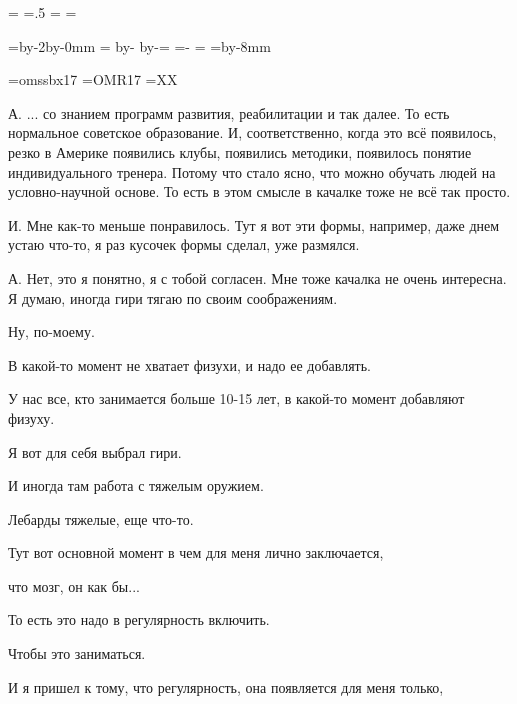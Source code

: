 \pdfpagewidth=297mm
\pdfpageheight=210mm
\pdfhorigin=1in
\pdfvorigin=0pt

\shhtotal=\pdfpagewidth
\htotal=.5\shhtotal
\vtotal=\pdfpageheight
\shoutline=0pt
\shstaplewidth=0pt
\shcrop=0pt
\shfootline={}
\shthickness=0pt
\qonepage

\horigin=4.5mm %
\hsize=\htotal \advance\hsize by-2\horigin \advance\hsize by-0mm %
=\htotal \advance{} by-\hsize \advance{} by-\horigin \horigin=
\hoffset=\htotal \advance\hoffset-\hsize \advance{}\horigin
\output={\ifodd\pageno\hoffset=0pt\fi \plainoutput}
\vorigin=2.5mm
\vsize=\vtotal \advance\vsize by-8mm

\font\speakerF=omssbx17
\font\headlineF=OMR17
\headline={\SEVENTEENRM X\hrulefill X}
\parindent=0pt
\def\A{\item{\speakerF А.}}
\def\I{\item{\speakerF И.}}

\A
... со знанием программ развития, реабилитации и так далее.
То есть нормальное советское образование.
И, соответственно, когда это всё появилось,
резко в Америке появились клубы, появились методики,
появилось понятие индивидуального тренера.
Потому что стало ясно, что можно обучать людей на условно-научной основе.
То есть в этом смысле в качалке тоже не всё так просто.

\I
Мне как-то меньше понравилось.
Тут я вот эти формы, например, даже днем устаю что-то,
я раз кусочек формы сделал, уже размялся.

\A
Нет, это я понятно, я с тобой согласен.
Мне тоже качалка не очень интересна.
Я думаю, иногда гири тягаю по своим соображениям.

Ну, по-моему.

В какой-то момент не хватает физухи, и надо ее добавлять.

У нас все, кто занимается больше 10-15 лет, в какой-то момент добавляют физуху.

Я вот для себя выбрал гири.

И иногда там работа с тяжелым оружием.

Лебарды тяжелые, еще что-то.

Тут вот основной момент в чем для меня лично заключается,

что мозг, он как бы...

То есть это надо в регулярность включить.

Чтобы это заниматься.

И я пришел к тому, что регулярность, она появляется для меня только,

